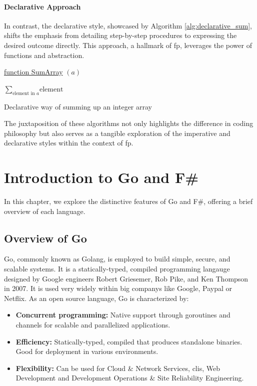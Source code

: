 \subsubsection{Declarative Approach}

In contrast, the declarative style, showcased by Algorithm \ref{alg:declarative_sum}, shifts the emphasis from detailing step-by-step procedures to expressing the desired outcome directly. This approach, a hallmark of \ac{fp}, leverages the power of functions and abstraction.

\begin{algorithm}

    \underline{function SumArray} $(a)$\;
    
    \BlankLine
    \Return $\sum_{\text{element in } a} \text{element}$
    
    \caption{Declarative way of summing up an integer array}
    \label{alg:declarative_sum}
\end{algorithm}

The juxtaposition of these algorithms not only highlights the difference in coding philosophy but also serves as a tangible exploration of the imperative and declarative styles within the context of \ac{fp}.


\chapter{Introduction to Go and F\#}\label{chap:language-comparison}
In this chapter, we explore the distinctive features of Go and F\#, offering a brief overview of each language.

    \section{Overview of Go}\label{sec:go-overview}
    Go, commonly known as Golang, is employed to build simple, secure, and scalable systems. It is a statically-typed, compiled programming langauge designed by Google engineers Robert Griesemer, Rob Pike, and Ken Thompson in 2007. It is used very widely within big companys like Google, Paypal or Netflix. As an open source language, Go is characterized by: 
    \begin{itemize}
        \item \textbf{Concurrent programming:}  Native support through goroutines and channels for scalable and parallelized applications.
        \item \textbf{Efficiency:} Statically-typed, compiled that produces standalone binaries. Good for deployment in various environments.
        \item \textbf{Flexibility:} Can be used for Cloud \& Network Services, \ac{cli}s, Web Development and Development Operations \& Site Reliability Engineering.
    \end{itemize}
    \cite{GoWebsite}


